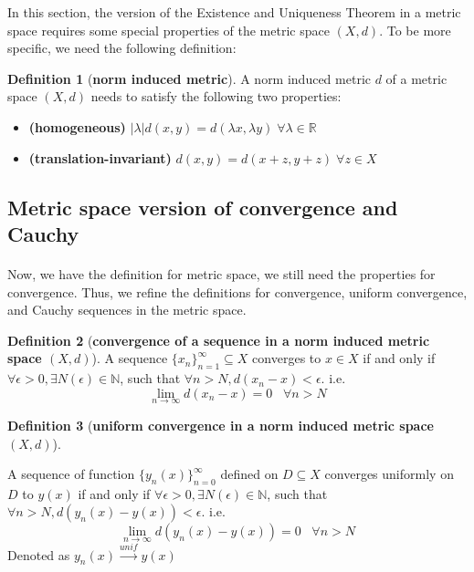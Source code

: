 \documentclass{article}
\theoremstyle{definition}
\newtheorem{definition}{Definition}[section]
\theoremstyle{remark}
\theoremstyle{example}
\begin{document}
In this section, the version of the Existence and Uniqueness Theorem in a metric space requires some special properties of the metric space $(X,d)$. To be more specific, we need the following definition:

\begin{definition}[\textbf{norm induced metric}] \cite{rudin_functional_nodate}
    A norm induced metric $d$ of a metric space $(X,d)$ needs to satisfy the following two properties:
    \begin{itemize}
        \item \textbf{(homogeneous)} $\lvert \lambda \rvert d(x,y) = d(\lambda x, \lambda y) \;\forall \lambda \in \mathbb{R}$
        \item \textbf{(translation-invariant)} $d(x,y) = d(x+z,y+z) \;\forall z \in X$
    \end{itemize}
\end{definition}

\subsection{Metric space version of convergence and Cauchy}

\paragraph{  }

Now, we have the definition for metric space, we still need the properties for convergence. Thus, we refine the definitions for convergence, uniform convergence, and Cauchy sequences in the metric space.

\begin{definition}[\textbf{convergence of a sequence in a norm induced metric space $(X,d)$}]\label{def:ConvMetric}
    A sequence $\{x_n\}_{n=1}^{\infty} \subseteq X$ converges to $x \in X$ if and only if $\forall \epsilon > 0, \exists N(\epsilon) \in \mathbb{N}$, such that $\forall n > N, d(x_n - x) < \epsilon$. i.e. 
    \begin{equation}\label{eqn:ConvMetric}
        \lim_{n \to \infty}{d(x_n - x) = 0} \;\;\; \forall n > N
    \end{equation}
\end{definition}

\begin{definition}[\textbf{uniform convergence in a norm induced metric space $(X,d)$}]\label{def:uniConvMetric}

    A sequence of function $\{y_n(x)\}_{n = 0}^{\infty}$ defined on $D \subseteq X$ converges uniformly on $D$ to $y(x)$ if and only if $\forall \epsilon > 0, \exists N(\epsilon) \in \mathbb{N}$, such that $\forall n > N, d(y_n(x) - y(x)) < \epsilon$. i.e.
        \begin{equation}
            \lim_{n \to \infty}{d(y_n(x) - y(x))} = 0 \;\;\; \forall n > N
        \end{equation}
    Denoted as $y_n(x) \xrightarrow{unif} y(x)$
\end{definition}
\end{document}
